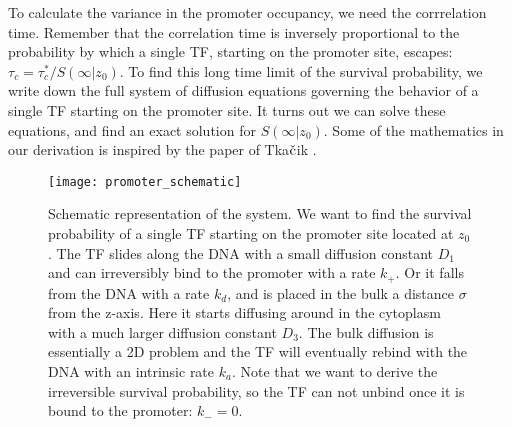 To calculate the variance in the promoter occupancy, we need the corrrelation time. Remember that the correlation time is inversely proportional to the probability by which a single TF, starting on the promoter site, escapes: $\tau_c = \tau_c^* / S(\infty|z_0)$. To find this long time limit of the survival probability, we write down the full system of diffusion equations governing the behavior of a single TF starting on the promoter site. It turns out we can solve these equations, and find an exact solution for $S(\infty|z_0)$. Some of the mathematics in our derivation is inspired by the paper of Tka$\check{\rm c}$ik \cite{Tkacik2009}. 

\begin{figure}[ht]
\centering
\texttt{[image: promoter\_schematic]}
\caption{ Schematic representation of the system. We want to find the survival probability of a single TF starting on the promoter site located at $z_0$. The TF slides along the DNA with a small diffusion constant $D_1$ and can irreversibly bind to the promoter with a rate $k_+$. Or it falls from the DNA with a rate $k_d$, and is placed in the bulk a distance $\sigma$ from the z-axis. Here it starts diffusing around in the cytoplasm with a much larger diffusion constant $D_3$. The bulk diffusion is essentially a 2D problem and the TF will eventually rebind with the DNA with an intrinsic rate $k_a$. Note that we want to derive the irreversible survival probability, so the TF can not unbind once it is bound to the promoter: $k_- = 0$.}
\end{figure}

